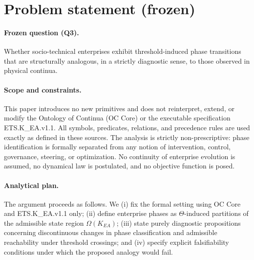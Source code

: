 ﻿\section{Problem statement (frozen)}
\label{sec:problem}

\paragraph{Frozen question (Q3).}
Whether socio-technical enterprises exhibit threshold-induced phase transitions
that are structurally analogous, in a strictly diagnostic sense, to those
observed in physical continua.

\paragraph{Scope and constraints.}
This paper introduces no new primitives and does not reinterpret, extend, or
modify the Ontology of Continua (OC Core) or the executable specification
ETS.K\_EA.v1.1. All symbols, predicates, relations, and precedence rules are used
exactly as defined in these sources. The analysis is strictly non-prescriptive:
phase identification is formally separated from any notion of intervention,
control, governance, steering, or optimization. No continuity of enterprise
evolution is assumed, no dynamical law is postulated, and no objective function
is posed.

\paragraph{Analytical plan.}
The argument proceeds as follows. We (i) fix the formal setting using OC Core and
ETS.K\_EA.v1.1 only; (ii) define enterprise phases as $\Theta$-induced partitions
of the admissible state region $\Omega(K_{EA})$; (iii) state purely diagnostic
propositions concerning discontinuous changes in phase classification and
admissible reachability under threshold crossings; and (iv) specify explicit
falsifiability conditions under which the proposed analogy would fail.
